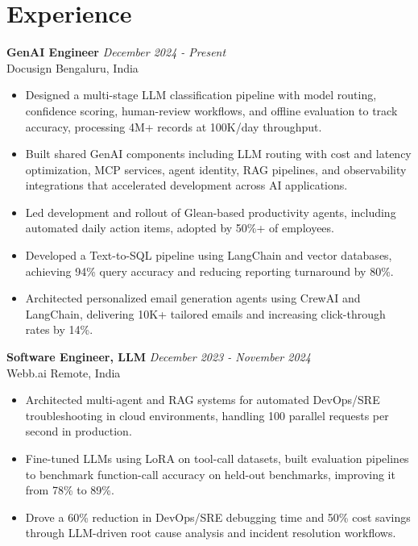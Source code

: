 \documentclass[a4paper,20pt]{article}
\begin{document}
\section{Experience}
  \noindent\textbf{GenAI Engineer} \hfill \textit{December 2024 - Present}\\
    Docusign \hfill Bengaluru, India
    \vspace{-2pt}
    \begin{itemize}[label=$\bullet$]
        \item Designed a multi-stage LLM classification pipeline with model routing, confidence scoring, human-review workflows, and offline evaluation to track accuracy, processing 4M+ records at 100K/day throughput.
        \vspace{-4pt}
        \item Built shared GenAI components including LLM routing with cost and latency optimization, MCP services, agent identity, RAG pipelines, and observability integrations that accelerated development across AI applications.
        \vspace{-4pt}
        \item Led development and rollout of Glean-based productivity agents, including automated daily action items, adopted by 50\%+ of employees.
        \vspace{-4pt}
        \item Developed a Text-to-SQL pipeline using LangChain and vector databases, achieving 94\% query accuracy and reducing reporting turnaround by 80\%.
        \vspace{-4pt}
        \item Architected personalized email generation agents using CrewAI and LangChain, delivering 10K+ tailored emails and increasing click-through rates by 14\%.
      \end{itemize}
 
  \noindent\textbf{Software Engineer, LLM} \hfill \textit{December 2023 - November 2024}\\
    Webb.ai \hfill Remote, India
    \vspace{-2pt}
    \begin{itemize}[label=$\bullet$]
        \item Architected multi-agent and RAG systems for automated DevOps/SRE troubleshooting in cloud environments, handling 100 parallel requests per second in production.
        \vspace{-4pt}
        \item Fine-tuned LLMs using LoRA on tool-call datasets, built evaluation pipelines to benchmark function-call accuracy on held-out benchmarks, improving it from 78\% to 89\%.
        \vspace{-4pt}
        \item Drove a 60\% reduction in DevOps/SRE debugging time and 50\% cost savings through LLM-driven root cause analysis and incident resolution workflows.
      \end{itemize}
 
\end{document}
